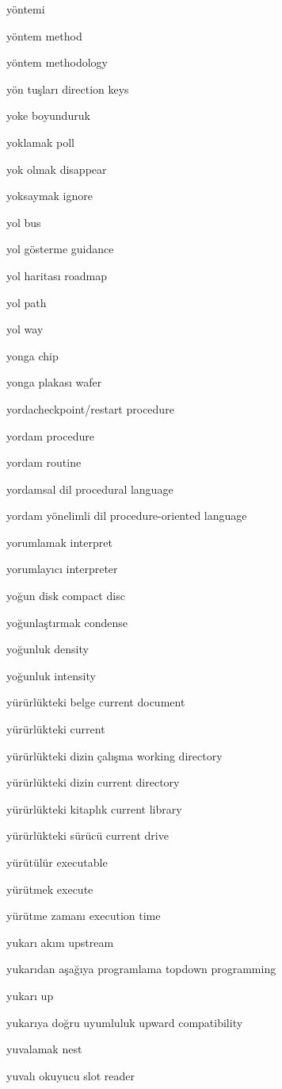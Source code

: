 \documentclass[12pt,fleqn]{article}\usepackage{../../common}
\begin{document}
yöntemi

yöntem method

yöntem methodology

yön tuşları direction keys

yoke boyunduruk

yoklamak poll

yok olmak disappear

yoksaymak ignore

yol bus

yol gösterme guidance

yol haritası roadmap

yol path

yol way

yonga chip

yonga plakası wafer

yordacheckpoint/restart procedure

yordam procedure

yordam routine

yordamsal dil procedural language

yordam yönelimli dil procedure-oriented language

yorumlamak interpret

yorumlayıcı interpreter

yoğun disk compact disc

yoğunlaştırmak condense

yoğunluk density

yoğunluk intensity

yürürlükteki belge current document

yürürlükteki current

yürürlükteki dizin çalışma working directory

yürürlükteki dizin current directory

yürürlükteki kitaplık current library

yürürlükteki sürücü current drive

yürütülür executable

yürütmek execute

yürütme zamanı execution time

yukarı akım upstream

yukarıdan aşağıya programlama topdown programming

yukarı up

yukarıya doğru uyumluluk upward compatibility

yuvalamak nest

yuvalı okuyucu slot reader
\end{document}
